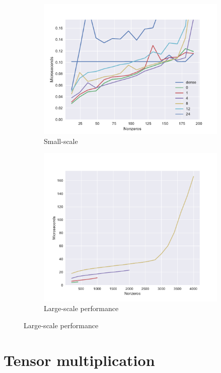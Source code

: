   \begin{figure}[!htb]
    \centering
    \begin{subfigure}[b]{0.8\textwidth}
      \centering
      \includegraphics[width=\textwidth]{images/jump_penalty.pdf}
      \caption{Small-scale }
      \label{fig:unrolled_time}
    \end{subfigure}
    \begin{subfigure}[b]{0.8\textwidth}
      \centering
      \includegraphics[width=\textwidth]{images/jump_scaling.pdf}
      \caption{Large-scale performance}
      \label{fig:unrolled_perf}
    \end{subfigure}
  \end{figure}


\section{Tensor multiplication}




